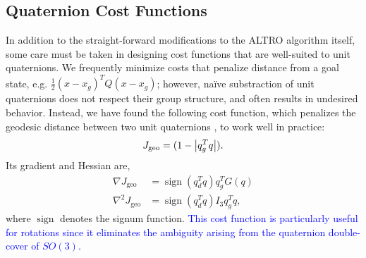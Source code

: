 \documentclass[letterpaper, 10 pt, conference]{ieeeconf}  %
\newcommand{\half}{\frac{1}{2}}
\DeclareMathOperator{\sign}{sign}
\newcommand{\added}[1]{\textcolor{blue}{#1}}
\begin{document}
    \subsection{Quaternion Cost Functions} \label{sec:cost_functions}
        In addition to the straight-forward modifications to the ALTRO algorithm itself, some care must be taken in designing cost functions that are well-suited to unit quaternions. We
        frequently minimize costs that penalize distance from a goal state, e.g. $\half
        (x-x_g)^T Q (x-x_g)$; however, na\"ive substraction of unit quaternions does not respect their group structure, and often results in undesired behavior. Instead, we have found the following cost function, which penalizes the geodesic
        distance between two unit quaternions \cite{Kuffner2004}, to work well in practice:
        \begin{equation} \label{eq:quat_geodesic}
            J_\text{geo} = (1-\abs{q_g^T q}) .
        \end{equation}
        Its gradient and Hessian are,
        \begin{align}
            \nabla J_\text{geo} &= \sign(q_d^T q) q_g^T G(q) \\
            \nabla^2 J_\text{geo} &= \sign(q_d^T q) I_3 q_g^T q ,
        \end{align}
        where $\sign$ denotes the signum function. \added{This cost function is particularly
        useful for rotations since it eliminates the ambiguity arising from the quaternion 
        double-cover of $SO(3)$.}
        
\end{document}
